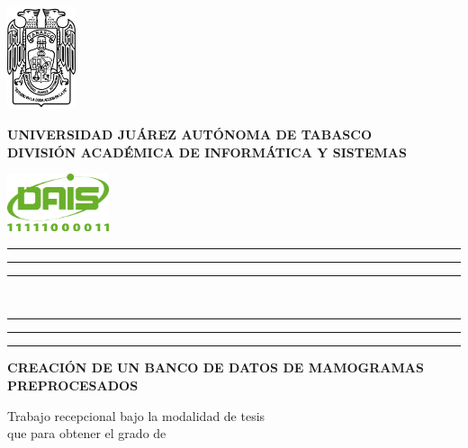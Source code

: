 {{    %
    \begin{minipage}[ht]{0.14\textwidth}
        \flushleft
        \includegraphics[width=2cm]{images/logo-ujat}
    \end{minipage}
    \begin{minipage}[ht]{0.70\textwidth}
    \centering
    {\selectfont
    {\bfseries{\normalsize UNIVERSIDAD JUÁREZ AUTÓNOMA DE TABASCO}}\\
    {\bfseries{\normalsize DIVISIÓN ACADÉMICA DE INFORMÁTICA Y SISTEMAS}}}
    \end{minipage}
    \begin{minipage}[ht]{0.14\textwidth}
        \flushright
        \includegraphics[width=3cm]{images/logo-dais}
    \end{minipage}

    \rule{\textwidth}{3pt}\vspace*{-\baselineskip}\vspace{7pt}
    \rule{\textwidth}{4pt}\vspace*{-\baselineskip}\vspace{7pt}
    \rule{\textwidth}{3pt}\\[\baselineskip]

    \begin{minipage}[ht]{0.10\textwidth}
        \flushleft
        \rule{3pt}{16cm}
        \rule{4pt}{16cm}
        \rule{3pt}{16cm}
    \end{minipage}
    \begin{minipage}[th]{0.89\textwidth}
    \centering
    {\bfseries{\Large CREACIÓN DE UN BANCO DE DATOS DE MAMOGRAMAS
    PREPROCESADOS}}
    \vspace*{2\baselineskip} \vfill

    Trabajo recepcional bajo la modalidad de tesis \\
    que para obtener el grado de\\[\baselineskip]


\end{minipage}}}
